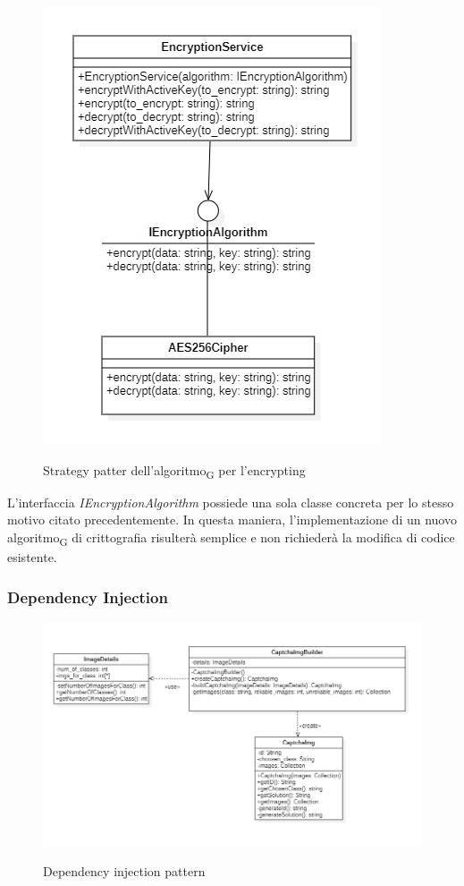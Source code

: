 \begin{figure}[H]
    \centering
    \includegraphics[scale = 0.8]{img/cryptStrategy.png}\\
    \caption{Strategy patter dell'algoritmo\textsubscript{G} per l'encrypting}
\end{figure}

L'interfaccia \textit{IEncryptionAlgorithm} possiede una sola classe concreta per lo stesso motivo citato precedentemente. In questa maniera, l'implementazione di un nuovo algoritmo\textsubscript{G} di crittografia risulterà semplice e non richiederà la modifica di codice esistente.

\subsubsection{Dependency Injection}

\begin{figure}[H]
    \centering
    \includegraphics[scale = 0.7]{img/dependency_injection.png}\\
    \caption{Dependency injection pattern}
\end{figure}

